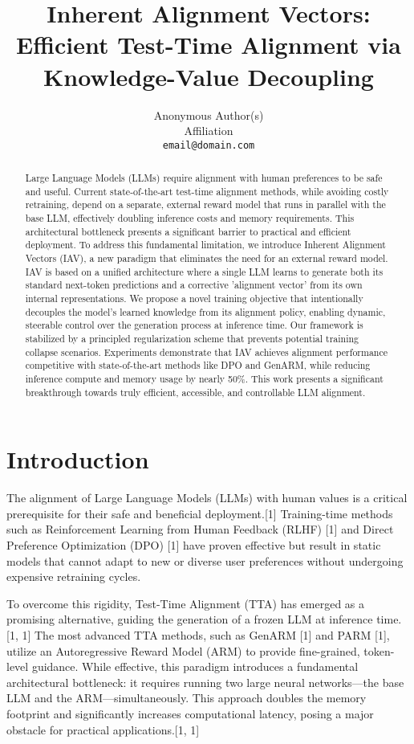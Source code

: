 \documentclass{article}
\title{Inherent Alignment Vectors: Efficient Test-Time Alignment via Knowledge-Value Decoupling}
\author{
  Anonymous Author(s) \\
  Affiliation \\
  \texttt{email@domain.com}
}
\begin{document}
\maketitle

\begin{abstract}
Large Language Models (LLMs) require alignment with human preferences to be safe and useful. Current state-of-the-art test-time alignment methods, while avoiding costly retraining, depend on a separate, external reward model that runs in parallel with the base LLM, effectively doubling inference costs and memory requirements. This architectural bottleneck presents a significant barrier to practical and efficient deployment. To address this fundamental limitation, we introduce Inherent Alignment Vectors (IAV), a new paradigm that eliminates the need for an external reward model. IAV is based on a unified architecture where a single LLM learns to generate both its standard next-token predictions and a corrective 'alignment vector' from its own internal representations. We propose a novel training objective that intentionally decouples the model's learned knowledge from its alignment policy, enabling dynamic, steerable control over the generation process at inference time. Our framework is stabilized by a principled regularization scheme that prevents potential training collapse scenarios. Experiments demonstrate that IAV achieves alignment performance competitive with state-of-the-art methods like DPO and GenARM, while reducing inference compute and memory usage by nearly 50\%. This work presents a significant breakthrough towards truly efficient, accessible, and controllable LLM alignment.
\end{abstract}

\section{Introduction}

The alignment of Large Language Models (LLMs) with human values is a critical prerequisite for their safe and beneficial deployment.[1] Training-time methods such as Reinforcement Learning from Human Feedback (RLHF) [1] and Direct Preference Optimization (DPO) [1] have proven effective but result in static models that cannot adapt to new or diverse user preferences without undergoing expensive retraining cycles.

To overcome this rigidity, Test-Time Alignment (TTA) has emerged as a promising alternative, guiding the generation of a frozen LLM at inference time.[1, 1] The most advanced TTA methods, such as GenARM [1] and PARM [1], utilize an Autoregressive Reward Model (ARM) to provide fine-grained, token-level guidance. While effective, this paradigm introduces a fundamental architectural bottleneck: it requires running two large neural networks—the base LLM and the ARM—simultaneously. This approach doubles the memory footprint and significantly increases computational latency, posing a major obstacle for practical applications.[1, 1]
\end{document}
